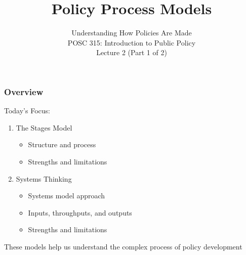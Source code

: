 \documentclass[10pt]{beamer}
\begin{document}
\title{Policy Process Models}
\subtitle{Understanding How Policies Are Made\\POSC 315: Introduction to Public Policy\\Lecture 2 (Part 1 of 2)}
\date{}

\maketitle

\begin{frame}
\frametitle{Overview}

\begin{block}{Today's Focus:}
\begin{enumerate}
\item The Stages Model
\begin{itemize}
\item Structure and process
\item Strengths and limitations
\end{itemize}
\item Systems Thinking
\begin{itemize}
\item Systems model approach
\item Inputs, throughputs, and outputs
\item Strengths and limitations
\end{itemize}
\end{enumerate}
\end{block}

\pause
\vspace{0.5cm}
\centering
These models help us understand the complex process of policy development

\end{frame}
\end{document}
